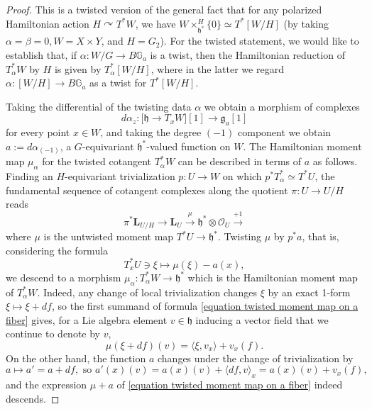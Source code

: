 \documentclass[11pt, a4paper]{amsart}
\numberwithin{equation}{section}
\theoremstyle{definition}
\theoremstyle{remark}
\newcommand{\GG}{\mathbb{G}}
\renewcommand{\to}{\longrightarrow}
\newcommand{\acts}{\curvearrowright}
\begin{document}
\begin{proof}
This is a twisted version of the general fact that for any polarized Hamiltonian action $H \acts T^*W$, we have $W \times_{\mathfrak{h}^*}^H \{0\} \simeq T^*[W/H]$ (by taking $\alpha = \beta = 0, W = X \times Y$, and $H = G_2$). For the twisted statement, we would like to establish that, if $\alpha: W/G \to B\GG_a$ is a twist, then the Hamiltonian reduction of $T^*_\alpha W$ by $H$ is given by $T^*_\alpha[W/H]$, where in the latter we regard $\alpha: [W/H] \to B\GG_a$ as a twist for $T^*[W/H]$.

Taking the differential of the twisting data $\alpha$ we obtain a morphism of complexes
\begin{equation}
    d\alpha_z: \big[\mathfrak{h} \to T_x W\big][1] \longrightarrow \mathfrak{g}_a[1]
\end{equation}
for every point $x \in W$, and taking the degree $(-1)$ component we obtain $a := d\alpha_{(-1)}$, a $G$-equivariant $\mathfrak{h}^*$-valued function on $W$. The Hamiltonian moment map $\mu_\alpha$ for the twisted cotangent $T^*_\alpha W$ can be described in terms of $a$ as follows. Finding an $H$-equivariant trivialization $p: U \to W$ on which $p^*T^*_\alpha \simeq T^*U$, the fundamental sequence of cotangent complexes along the quotient $\pi: U \to U/H$ reads
\begin{equation} \label{equation moment map of polarized action}
    \pi^*\mathbf{L}_{U/H} \longrightarrow \mathbf{L}_U \overset{\mu}{\longrightarrow} \mathfrak{h}^* \otimes \mathcal{O}_U \overset{+1}{\to}
\end{equation}
where $\mu$ is the untwisted moment map $T^*U \to \mathfrak{h}^*$. Twisting $\mu$ by $p^*a$, that is, considering the formula
\begin{equation} \label{equation twisted moment map on a fiber}
    T^*_xU \ni \xi \longmapsto \mu(\xi) - a(x),
\end{equation}
we descend to a morphism $\mu_\alpha: T^*_\alpha W \to \mathfrak{h}^*$ which is the Hamiltonian moment map of $T^*_\alpha W$. Indeed, any change of local trivialization changes $\xi$ by an exact 1-form $\xi \mapsto \xi + df$, so the first summand of formula \eqref{equation twisted moment map on a fiber} gives, for a Lie algebra element $v \in \mathfrak{h}$ inducing a vector field that we continue to denote by $v$, 
\begin{equation}
    \mu(\xi+df)(v) = \langle \xi, v_x\rangle + v_x(f). 
\end{equation}
On the other hand, the function $a$ changes under the change of trivialization by
\begin{equation}
    a \mapsto a' = a+df, \text{ so } a'(x)(v) = a(x)(v) + \langle df, v\rangle_x = a(x)(v) + v_x(f),
\end{equation}
and the expression $\mu+a$ of \eqref{equation twisted moment map on a fiber} indeed descends.


\end{proof}
\end{document}
